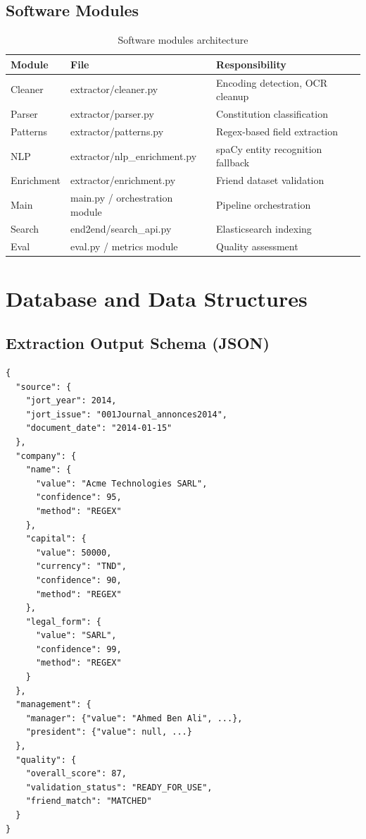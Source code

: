 \documentclass[12pt,a4paper]{report}
\begin{document}
\subsection{Software Modules}

\begin{table}[H]
\centering
\begin{tabular}{|l|l|p{5cm}|}
\hline
\textbf{Module} & \textbf{File} & \textbf{Responsibility} \\
\hline
Cleaner & extractor/cleaner.py & Encoding detection, OCR cleanup \\
Parser & extractor/parser.py & Constitution classification \\
Patterns & extractor/patterns.py & Regex-based field extraction \\
NLP & extractor/nlp\_enrichment.py & spaCy entity recognition fallback \\
Enrichment & extractor/enrichment.py & Friend dataset validation \\
Main & main.py / orchestration module & Pipeline orchestration \\
Search & end2end/search\_api.py & Elasticsearch indexing \\
Eval & eval.py / metrics module & Quality assessment \\
\hline
\end{tabular}
\caption{Software modules architecture}
\end{table}

\section{Database and Data Structures}

\subsection{Extraction Output Schema (JSON)}

\begin{verbatim}
{
  "source": {
    "jort_year": 2014,
    "jort_issue": "001Journal_annonces2014",
    "document_date": "2014-01-15"
  },
  "company": {
    "name": {
      "value": "Acme Technologies SARL",
      "confidence": 95,
      "method": "REGEX"
    },
    "capital": {
      "value": 50000,
      "currency": "TND",
      "confidence": 90,
      "method": "REGEX"
    },
    "legal_form": {
      "value": "SARL",
      "confidence": 99,
      "method": "REGEX"
    }
  },
  "management": {
    "manager": {"value": "Ahmed Ben Ali", ...},
    "president": {"value": null, ...}
  },
  "quality": {
    "overall_score": 87,
    "validation_status": "READY_FOR_USE",
    "friend_match": "MATCHED"
  }
}
\end{verbatim}
\end{document}
